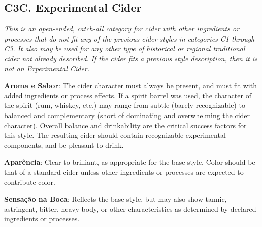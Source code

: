 \subsection*{C3C. Experimental Cider}

\textit{This is an open-ended, catch-all category for cider with other ingredients or processes that do not fit any of the previous cider styles in categories C1 through C3. It also may be used for any other type of historical or regional traditional cider not already described. If the cider fits a previous style description, then it is not an Experimental Cider.}

\textbf{Aroma e Sabor}: The cider character must always be present, and must fit with added ingredients or process effects. If a spirit barrel was used, the character of the spirit (rum, whiskey, etc.) may range from subtle (barely recognizable) to balanced and complementary (short of dominating and overwhelming the cider character). Overall balance and drinkability are the critical success factors for this style. The resulting cider should contain recognizable experimental components, and be pleasant to drink.

\textbf{Aparência}: Clear to brilliant, as appropriate for the base style. Color should be that of a standard cider unless other ingredients or processes are expected to contribute color.

\textbf{Sensação na Boca}: Reflects the base style, but may also show tannic, astringent, bitter, heavy body, or other characteristics as determined by declared ingredients or processes.

